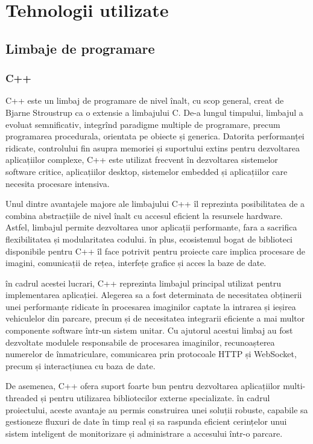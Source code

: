\chapter{Tehnologii utilizate}

\section{Limbaje de programare}

\subsection*{C++}

C++ este un limbaj de programare de nivel înalt, cu scop general, creat de Bjarne Stroustrup ca o extensie a limbajului C. De-a lungul timpului, limbajul a evoluat semnificativ, integrînd paradigme multiple de programare, precum programarea procedurala, orientata pe obiecte și generica. Datorita performanței ridicate, controlului fin asupra memoriei și suportului extins pentru dezvoltarea aplicațiilor complexe, C++ este utilizat frecvent în dezvoltarea sistemelor software critice, aplicațiilor desktop, sistemelor embedded și aplicațiilor care necesita procesare intensiva.

Unul dintre avantajele majore ale limbajului C++ îl reprezinta posibilitatea de a combina abstracțiile de nivel înalt cu accesul eficient la resursele hardware. Astfel, limbajul permite dezvoltarea unor aplicații performante, fara a sacrifica flexibilitatea și modularitatea codului. în plus, ecosistemul bogat de biblioteci disponibile pentru C++ îl face potrivit pentru proiecte care implica procesare de imagini, comunicații de rețea, interfețe grafice și acces la baze de date.

în cadrul acestei lucrari, C++ reprezinta limbajul principal utilizat pentru implementarea aplicației. Alegerea sa a fost determinata de necesitatea obținerii unei performanțe ridicate în procesarea imaginilor captate la intrarea și ieșirea vehiculelor din parcare, precum și de necesitatea integrarii eficiente a mai multor componente software într-un sistem unitar. Cu ajutorul acestui limbaj au fost dezvoltate modulele responsabile de procesarea imaginilor, recunoașterea numerelor de înmatriculare, comunicarea prin protocoale HTTP și WebSocket, precum și interacțiunea cu baza de date.

De asemenea, C++ ofera suport foarte bun pentru dezvoltarea aplicațiilor multi-threaded și pentru utilizarea bibliotecilor externe specializate. în cadrul proiectului, aceste avantaje au permis construirea unei soluții robuste, capabile sa gestioneze fluxuri de date în timp real și sa raspunda eficient cerințelor unui sistem inteligent de monitorizare și administrare a accesului într-o parcare.

